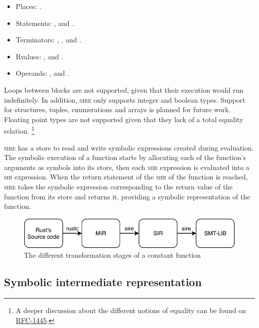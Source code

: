 \begin{itemize}
    \item Places: .
    \item Statements: ,  and .
    \item Terminators: , ,  and .
    \item Rvalues: ,  and .
    \item Operands: ,  and .
\end{itemize}

Loops between blocks are not supported, given that their execution would run
indefinitely. In addition, \textsc{sire} only supports integer and boolean
types. Support for structures, tuples, enumerations and arrays is planned for
future work.  Floating point types are not supported given that they lack of a
total equality relation. \footnote{A deeper discussion about the different notions of equality
can be found on
\href{https://github.com/rust-lang/rfcs/blob/master/text/1445-restrict-constants-in-patterns.md}{RFC-1445}.}

\textsc{sire} has a store to read and write symbolic expressions created
during evaluation. The symbolic execution of a function starts by allocating
each of the function's arguments as symbols into its store, then each
\textsc{mir} expression is evaluated into a \textsc{sir} expression. When the
return statement of the \textsc{mir} of the function is reached, \textsc{sire}
takes the symbolic expression corresponding to the return value of the function
from its store and returns it, providing a symbolic representation of the
function. 

\begin{figure}[h]
    \centering
    \includegraphics[width=15cm]{images/flow.pdf}
    \caption{The different transformation stages of a constant function}
    \label{fig:flow}
\end{figure}


\subsection{Symbolic intermediate representation}


